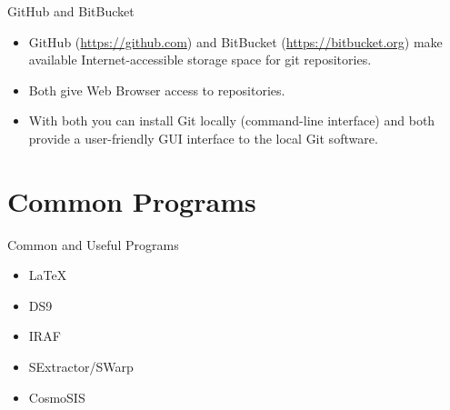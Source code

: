 \documentclass{beamer}
\begin{document}

\begin{frame}{GitHub and BitBucket}    
  \begin{itemize}
  \item GitHub (\url{https://github.com}) and BitBucket (\url{https://bitbucket.org}) make available Internet-accessible storage space for git repositories.
  \item Both give Web Browser access to repositories.
  \item With both you can install Git locally (command-line interface) and both provide a user-friendly GUI interface to the local Git software.
  \end{itemize}
\end{frame}


\section{Common Programs}
\begin{frame}{Common and Useful Programs}
  \begin{itemize}
  \item \LaTeX
  \item DS9
  \item IRAF
  \item SExtractor/SWarp
  \item CosmoSIS
  \end{itemize}
\end{frame}
\end{document}
